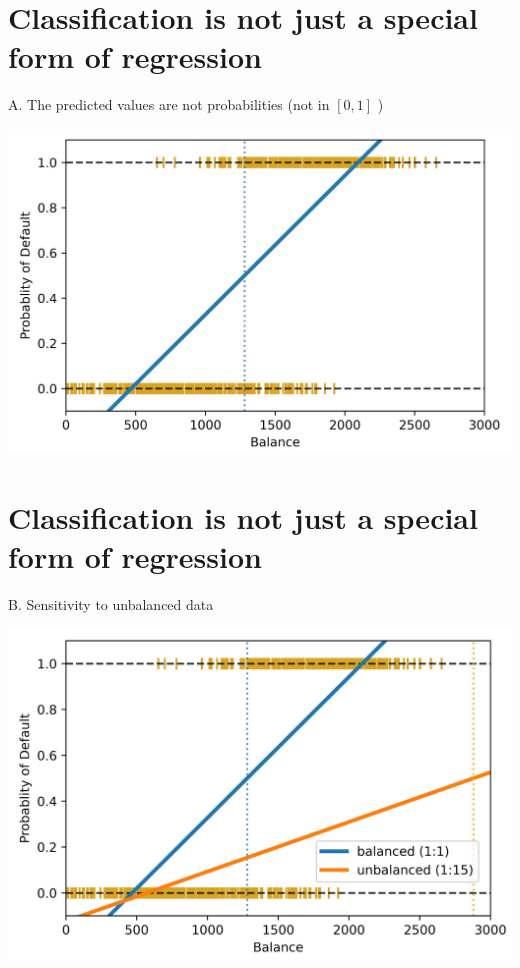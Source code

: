 \documentclass[10pt]{article}
\begin{document}
\section*{Classification is not just a special form of regression}
A. The predicted values are not probabilities (not in $[0,1]$ )

\begin{center}
\includegraphics[max width=\textwidth]{2023_12_30_cf784c471dfd1dd5afbag-13}
\end{center}

\section*{Classification is not just a special form of regression}
B. Sensitivity to unbalanced data

\begin{center}
\includegraphics[max width=\textwidth]{2023_12_30_cf784c471dfd1dd5afbag-14}
\end{center}
\end{document}
